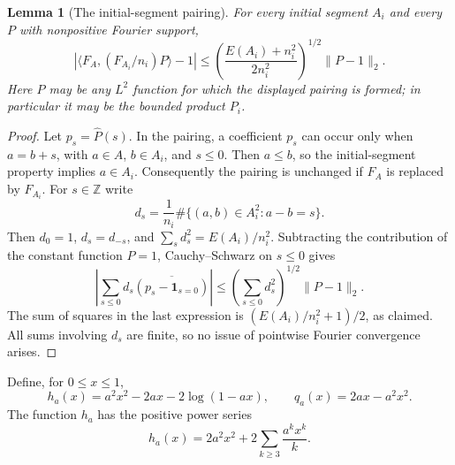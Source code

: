 \documentclass[11pt,reqno]{amsart}
\numberwithin{equation}{section}
\newtheorem{lemma}[theorem]{Lemma}
\theoremstyle{definition}
\theoremstyle{remark}
\newcommand{\Z}{\mathbb Z}
\newcommand{\one}{\mathbf 1}
\newcommand{\norm}[1]{\lVert#1\rVert}
\newcommand{\ip}[2]{\langle#1,#2\rangle}
\begin{document}
\begin{lemma}[The initial-segment pairing]\label{lem:prefix-pairing}
For every initial segment $A_i$ and every $P$ with nonpositive Fourier
support,
\begin{equation}\label{eq:prefix-error}
 \left|\ip{F_A}{(F_{A_i}/n_i)P}-1\right|
 \le
 \left(\frac{E(A_i)+n_i^2}{2n_i^2}\right)^{1/2}
 \norm{P-1}_2.
\end{equation}
Here $P$ may be any $L^2$ function for which the displayed pairing is
formed; in particular it may be the bounded product $P_i$.
\end{lemma}
\begin{proof}
Let $p_s=\widehat P(s)$. In the pairing, a coefficient $p_s$ can occur
only when $a=b+s$, with $a\in A$, $b\in A_i$, and $s\le0$. Then
$a\le b$, so the initial-segment property implies $a\in A_i$.
Consequently the pairing is unchanged if $F_A$ is replaced by $F_{A_i}$.
For $s\in\Z$ write
\[
 d_s=\frac1{n_i}\#\{(a,b)\in A_i^2:a-b=s\}.
\]
Then $d_0=1$, $d_s=d_{-s}$, and
$\sum_sd_s^2=E(A_i)/n_i^2$. Subtracting the contribution of the constant
function $P=1$, Cauchy--Schwarz on $s\le0$ gives
\[
 \left|\sum_{s\le0}d_s\overline{(p_s-\one_{s=0})}\right|
 \le\left(\sum_{s\le0}d_s^2\right)^{1/2}\norm{P-1}_2.
\]
The sum of squares in the last expression is
$(E(A_i)/n_i^2+1)/2$, as claimed. All sums involving $d_s$ are finite,
so no issue of pointwise Fourier convergence arises.
\end{proof}

Define, for $0\le x\le1$,
\begin{equation}\label{eq:h-q}
 h_a(x)=a^2x^2-2ax-2\log(1-ax),\qquad
 q_a(x)=2ax-a^2x^2.
\end{equation}
The function $h_a$ has the positive power series
\begin{equation}\label{eq:h-expansion}
 h_a(x)=2a^2x^2+2\sum_{k\ge3}\frac{a^kx^k}{k}.
\end{equation}
\end{document}
